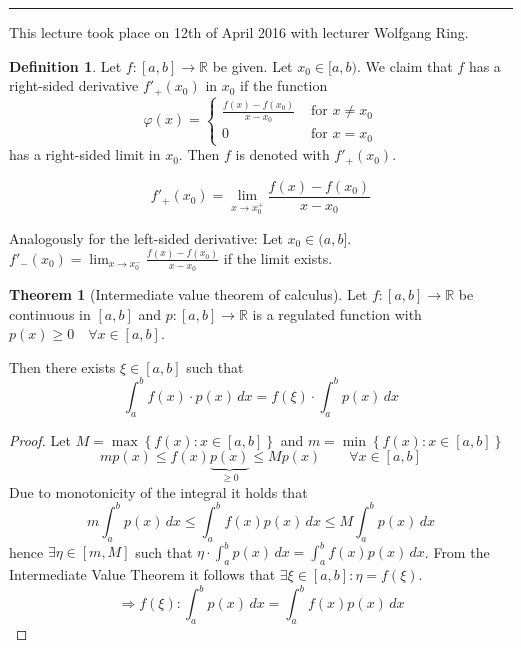 \documentclass[a4paper,landscape,twocolumn]{article}
\theoremstyle{definition}
\newtheorem{theorem}{Theorem}
\newtheorem{defi}{Definition}
\newcommand\set[1]{\left\{#1\right\}}
\newcommand\meta[3]{\hrule{} This #1 took place on #2 with lecturer #3.\par}
\begin{document}
\meta{lecture}{12th of April 2016}{Wolfgang Ring}

\begin{defi}
  Let $f: [a,b] \to \mathbb R$ be given.
  Let $x_0 \in [a,b)$. We claim that $f$ has a right-sided derivative $f'_+(x_0)$ in $x_0$
  if the function
  \[
    \varphi(x) = \begin{cases}
      \frac{f(x) - f(x_0)}{x - x_0} & \text{ for } x \neq x_0 \\
      0                             & \text{ for } x = x_0
    \end{cases}
  \]
  has a right-sided limit in $x_0$.
  Then $f$ is denoted with $f'_+(x_0)$.

  \[ f'_+(x_0) = \lim_{x\to x_0^+} \frac{f(x) - f(x_0)}{x - x_0} \]

  Analogously for the left-sided derivative:
  Let $x_0 \in (a,b]$. $f'_-(x_0) = \lim_{x \to x_0^-} \frac{f(x) - f(x_0)}{x - x_0}$
  if the limit exists.
\end{defi}

\begin{theorem}[Intermediate value theorem of calculus]
  Let $f: [a,b] \to \mathbb R$ be continuous in $[a,b]$ and $p: [a,b] \to \mathbb R$
  is a regulated function with $p(x) \geq 0 \quad \forall x \in [a,b]$.

  Then there exists $\xi \in [a,b]$ such that
  \[ \int_a^b f(x) \cdot p(x) \, dx = f(\xi) \cdot \int_a^b p(x) \, dx \]
\end{theorem}

\begin{proof}
  Let $M = \max\set{f(x): x \in [a,b]}$ and $m = \min\set{f(x): x \in [a,b]}$
  \[ m p(x) \leq f(x) \underbrace{p(x)}_{\geq 0} \leq M p(x) \qquad \forall x \in [a,b] \]
  Due to monotonicity of the integral it holds that
  \[ m \int_a^b p(x) \, dx \leq \int_a^b f(x) p(x) \, dx \leq M \int_a^b p(x) \, dx \]
  hence $\exists \eta \in [m,M]$ such that $\eta \cdot \int_a^b p(x) \, dx = \int_a^b f(x) p(x) \, dx$.
  From the Intermediate Value Theorem it follows that $\exists \xi \in [a,b]: \eta = f(\xi)$.
  \[ \Rightarrow f(\xi): \int_a^b p(x) \, dx = \int_a^b f(x) p(x) \, dx \]
\end{proof}
\end{document}
